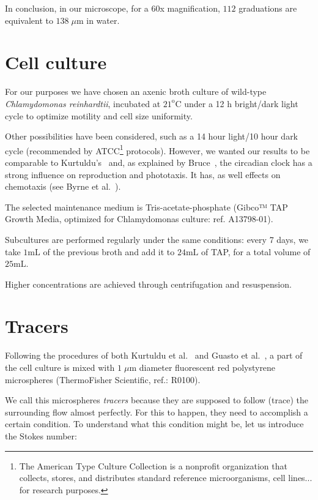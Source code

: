In conclusion, in our microscope, for a 60x magnification, $112$ graduations are equivalent to $138 \; \mu \textrm{m}$ in water.

\section{Cell culture}

For our purposes we have chosen an axenic broth culture of wild-type \textit{Chlamydomonas reinhardtii}, incubated at $21^\textrm{o} \textrm{C}$ under a 12 h bright/dark light cycle to optimize motility and cell size uniformity.

Other possibilities have been considered, such as a 14 hour light/10 hour dark cycle (recommended by ATCC\footnote{The American Type Culture Collection is a nonprofit organization that collects, stores, and distributes standard reference microorganisms, cell lines... for research purposes.} protocols). However, we wanted our results to be comparable to Kurtuldu's~\cite{Kurtuldu2011} and, as explained by Bruce~\cite{Bruce}, the circadian clock has a strong influence on reproduction and phototaxis. It has, as well effects on chemotaxis (see Byrne et al.~\cite{Byrne}).

The selected maintenance medium is Tris-acetate-phosphate (Gibco™ TAP Growth Media, optimized for Chlamydomonas culture: ref. A13798-01). 

Subcultures are performed regularly under the same conditions: every 7 days, we take $1 \textrm{mL}$ of the previous broth and add it to $24 \textrm{mL}$ of TAP, for a total volume of $25 \textrm{mL}$.

Higher concentrations are achieved through centrifugation and resuspension.

\section{Tracers}

Following the procedures of both Kurtuldu et al.~\cite{Kurtuldu2011} and Guasto et al.~\cite{Guasto}, a part of the cell culture is mixed with $1 \; \mu \textrm{m}$ diameter fluorescent red polystyrene microspheres (ThermoFisher Scientific, ref.: R0100). 

We call this microspheres \textit{tracers} because they are supposed to follow (trace) the surrounding flow almost perfectly. For this to happen, they need to accomplish a certain condition. To understand what this condition might be, let us introduce the Stokes number:

